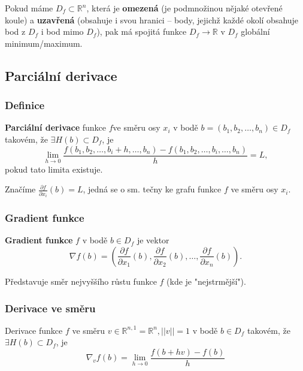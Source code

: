 \noindent Pokud máme $D_f \subset \mathbb{R}^n$, která je \textbf{omezená} (je podmnožinou nějaké otevřené koule) a \textbf{uzavřená} (obsahuje i svou hranici -- body, jejichž každé okolí obsahuje bod z $D_f$ i bod mimo $D_f$), pak má spojitá funkce $D_f \to \mathbb{R}$ v $D_f$ globální minimum/maximum.

\subsection{Parciální derivace}

\subsubsection{Definice}

\textbf{Parciální derivace} funkce $f$ve směru osy $x_i$ v bodě $b = (b_1, b_2, \ldots, b_n) \in D_f$ takovém, že $\exists H(b) \subset D_f$, je
\begin{equation}
    \lim_{h \to 0}\frac{f(b_1, b_2, \ldots, b_i + h, \ldots, b_n) - f(b_1, b_2, \ldots, b_i, \ldots, b_n)}{h} = L,
\end{equation}
pokud tato limita existuje.

\vspace{4pt} \noindent Značíme $\frac{\partial f}{\partial x_i}(b) = L$, jedná se o sm. tečny ke grafu funkce $f$ ve směru osy $x_i$.

\subsubsection{Gradient funkce}

\textbf{Gradient funkce} $f$ v bodě $b \in D_f$ je vektor
\begin{equation}
    \nabla f(b) = \left(\frac{\partial f}{\partial x_1}(b), \frac{\partial f}{\partial x_2}(b), \ldots, \frac{\partial f}{\partial x_n}(b)\right).
\end{equation}

Představuje směr nejvyššího růstu funkce $f$ (kde je "nejstrmější").

\subsubsection{Derivace ve směru}

Derivace funkce $f$ ve směru $v \in \mathbb{R}^{n,1} = \mathbb{R}^n, ||v|| = 1$ v bodě $b \in D_f$ takovém, že $\exists H(b) \subset D_f$, je
\begin{equation}
    \nabla_v f(b) = \lim_{h \to 0}\frac{f(b + hv) - f(b)}{h}
\end{equation}

